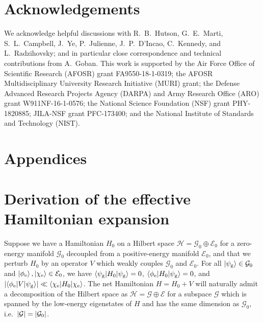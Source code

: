 \documentclass[preprint,showkeys,nofootinbib]{revtex4-1}
\newcommand{\bk}{\braket} %
\newcommand{\g}{\text{g}}
\newcommand{\e}{\text{e}}
\newcommand{\E}{\mathcal{E}}
\newcommand{\G}{\mathcal{G}}
\renewcommand{\H}{\mathcal{H}}
\newcommand{\1}{\mathds{1}}
\begin{document}

\section*{Acknowledgements}

We acknowledge helpful discussions with R.~B.~Hutson, G.~E.~Marti,
S.~L.~Campbell, J.~Ye, P.~Julienne, J.~P.~D'Incao, C.~Kennedy, and
L.~Radzihovsky; and in particular close correspondence and technical
contributions from A.~Goban.  This work is supported by the Air Force
Office of Scientific Research (AFOSR) grant FA9550-18-1-0319; the
AFOSR Multidisciplinary University Research Initiative (MURI) grant;
the Defense Advanced Research Projects Agency (DARPA) and Army
Research Office (ARO) grant W911NF-16-1-0576; the National Science
Foundation (NSF) grant PHY-1820885; JILA-NSF grant PFC-173400; and the
National Institute of Standards and Technology (NIST).



\section*{Appendices}
\appendix


\section{Derivation of the effective Hamiltonian expansion}
\label{sec:eff_derivation}

Suppose we have a Hamiltonian $H_0$ on a Hilbert space
$\H=\G_0\oplus\E_0$ for a zero-energy manifold $\G_0$ decoupled from a
positive-energy manifold $\E_0$, and that we perturb $H_0$ by an
operator $V$ which weakly couples $\G_0$ and $\E_0$.  For all
$\ket{\psi_\g}\in\G_0$ and $\ket{\phi_\e},\ket{\chi_\e}\in\E_0$, we
have $\bk{\psi_\g|H_0|\psi_\g}=0$, $\bk{\phi_\e|H_0|\psi_\g}=0$, and
$\abs{\bk{\phi_\e|V|\psi_\g}}\ll\bk{\chi_\e|H_0|\chi_\e}$.  The net
Hamiltonian $H=H_0+V$ will naturally admit a decomposition of the
Hilbert space as $\H=\G\oplus\E$ for a subspace $\G$ which is spanned
by the low-energy eigenstates of $H$ and has the same dimension as
$\G_0$, i.e.~$\abs{\G}=\abs{\G_0}$.
\end{document}
